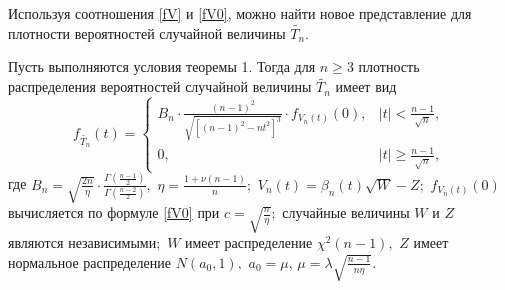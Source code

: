 \smallskip

Используя соотношения \eqref{fV} и \eqref{fV0}, можно найти новое представление для плотности вероятностей случайной величины  $\tilde{T_n}$.

\smallskip

\begin{theorem}[2]
Пусть  выполняются условия теоремы {\rm 1.}  Тогда для $n\ge 3$ плотность распределения
вероятностей случайной величины
$\tilde{T_{n}}$  имеет вид
\begin{equation}\label{theorem4}
f_{\tilde{T_n}}(t)=
\left\{
\begin{array}{cr}
B_{n}\cdot\frac{(n-1)^2}{\sqrt{\left[(n-1)^2-nt^2\right]^{3}}}\cdot f_{V_{n}(t)}(0),
 &|t|<\frac{n-1}{\sqrt{n}}, \\
0,& |t|\ge\frac{n-1}{\sqrt{n}},
\end{array}
\right.
\end{equation}
где
$B_{n}=\sqrt{\frac{2n}{\eta}}\cdot \frac{\Gamma\left(\frac{n-1}{2}\right)}
{\Gamma\left(\frac{n-2}{2}\right)},$ $\eta=\frac{1+\nu(n-1)}{n};$
$V_n(t)=\beta_n(t)\sqrt{W}-Z;$
$f_{V_n(t)}(0)$ вычисляется по формуле \eqref{fV0}  при $c=\sqrt{\frac{n}{\eta}};$
случайные величины $W$ и $Z$ являются независимыми$;$
$W$ имеет распределение $\chi^2(n-1),$
 $Z$ имеет нормальное распределение $N(a_0, 1),$
 $a_0=\mu$, $\mu=\lambda\sqrt{\frac{n-1}{n\eta}}$.
\end{theorem}

